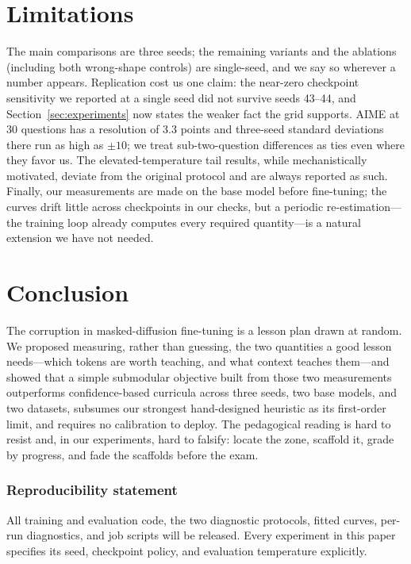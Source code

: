 \documentclass{article} %
\begin{document}
\section{Limitations}

The main comparisons are three seeds; the remaining variants and the ablations (including both wrong-shape controls) are single-seed, and we say so wherever a number appears. Replication cost us one claim: the near-zero checkpoint sensitivity we reported at a single seed did not survive seeds 43--44, and Section~\ref{sec:experiments} now states the weaker fact the grid supports. AIME at 30 questions has a resolution of 3.3 points and three-seed standard deviations there run as high as $\pm 10$; we treat sub-two-question differences as ties even where they favor us. The elevated-temperature tail results, while mechanistically motivated, deviate from the original protocol and are always reported as such. Finally, our measurements are made on the base model before fine-tuning; the curves drift little across checkpoints in our checks, but a periodic re-estimation---the training loop already computes every required quantity---is a natural extension we have not needed.

\section{Conclusion}

The corruption in masked-diffusion fine-tuning is a lesson plan drawn at random. We proposed measuring, rather than guessing, the two quantities a good lesson needs---which tokens are worth teaching, and what context teaches them---and showed that a simple submodular objective built from those two measurements outperforms confidence-based curricula across three seeds, two base models, and two datasets, subsumes our strongest hand-designed heuristic as its first-order limit, and requires no calibration to deploy. The pedagogical reading is hard to resist and, in our experiments, hard to falsify: locate the zone, scaffold it, grade by progress, and fade the scaffolds before the exam.

\subsubsection*{Reproducibility statement}
All training and evaluation code, the two diagnostic protocols, fitted curves, per-run diagnostics, and job scripts will be released. Every experiment in this paper specifies its seed, checkpoint policy, and evaluation temperature explicitly.
\end{document}
